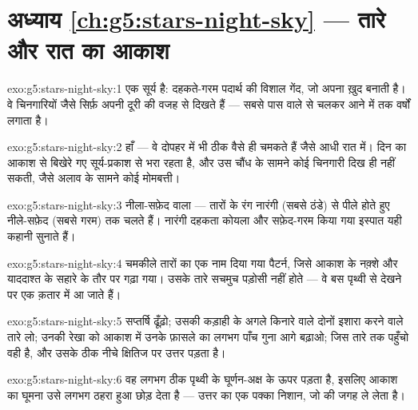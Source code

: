 \section*{अध्याय \ref{ch:g5:stars-night-sky} --- तारे और रात का आकाश}

\begin{solution}{exo:g5:stars-night-sky:1}
 एक सूर्य है: दहकते-गरम पदार्थ की विशाल गेंद, जो अपना  ख़ुद
बनाती है। वे चिनगारियों जैसे सिर्फ़ अपनी दूरी की वजह से दिखते हैं ---
सबसे पास वाले से चलकर आने में  तक वर्षों लगाता है।
\end{solution}

\begin{solution}{exo:g5:stars-night-sky:2}
हाँ --- वे दोपहर में भी ठीक वैसे ही चमकते हैं जैसे आधी रात में। दिन
का आकाश  से बिखेरे गए सूर्य-प्रकाश से भरा रहता है, और उस चौंध के
सामने कोई चिनगारी दिख ही नहीं सकती, जैसे अलाव के सामने कोई मोमबत्ती।
\end{solution}

\begin{solution}{exo:g5:stars-night-sky:3}
नीला-सफ़ेद वाला --- तारों के रंग नारंगी (सबसे ठंडे) से पीले होते हुए
नीले-सफ़ेद (सबसे गरम) तक चलते हैं। नारंगी दहकता कोयला और सफ़ेद-गरम
किया गया इस्पात यही कहानी सुनाते हैं।
\end{solution}

\begin{solution}{exo:g5:stars-night-sky:4}
चमकीले तारों का एक नाम दिया गया पैटर्न, जिसे आकाश के नक़्शे और
याददाश्त के सहारे के तौर पर गढ़ा गया। उसके तारे सचमुच पड़ोसी नहीं
होते --- वे बस पृथ्वी से देखने पर एक क़तार में आ जाते हैं।
\end{solution}

\begin{solution}{exo:g5:stars-night-sky:5}
सप्तर्षि ढूँढ़ो; उसकी कड़ाही के अगले किनारे वाले दोनों इशारा करने वाले
तारे लो; उनकी रेखा को आकाश में उनके फ़ासले का लगभग पाँच गुना आगे
बढ़ाओ; जिस तारे तक पहुँचो वही  है, और उसके ठीक नीचे क्षितिज
पर उत्तर पड़ता है।
\end{solution}

\begin{solution}{exo:g5:stars-night-sky:6}
वह लगभग ठीक पृथ्वी के घूर्णन-अक्ष के ऊपर पड़ता है, इसलिए आकाश का घूमना
उसे लगभग ठहरा हुआ छोड़ देता है --- उत्तर का एक पक्का निशान, जो
 की जगह ले लेता है।
\end{solution}

